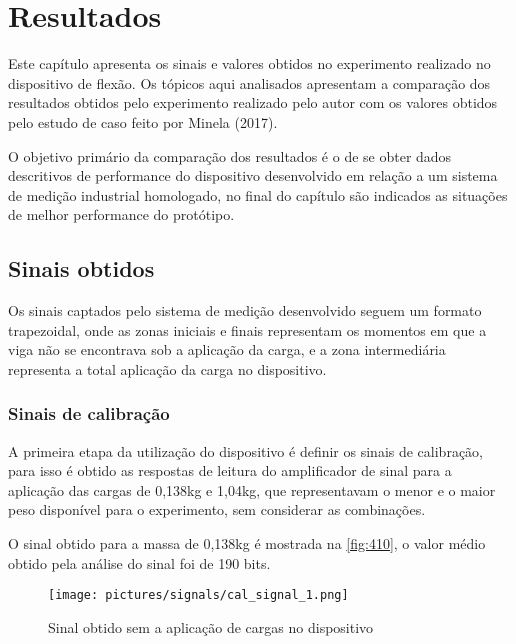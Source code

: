 
\chapter{Resultados}\label{ch:capitulo_resultados}

Este capítulo apresenta os sinais e valores obtidos no experimento realizado no dispositivo de flexão.
Os tópicos aqui analisados apresentam a comparação dos resultados obtidos pelo experimento realizado pelo autor com os valores obtidos pelo
estudo de caso feito por Minela (2017).

O objetivo primário da comparação dos resultados é o de se obter dados descritivos de performance do dispositivo desenvolvido em relação a um sistema de medição industrial
homologado, no final do capítulo são indicados as situações de melhor performance do protótipo.

\section{Sinais obtidos}

Os sinais captados pelo sistema de medição desenvolvido seguem um formato trapezoidal, onde as zonas iniciais e finais representam os momentos em que a viga não se encontrava
sob a aplicação da carga, e a zona intermediária representa a total aplicação da carga no dispositivo.

\subsection{Sinais de calibração}

A primeira etapa da utilização do dispositivo é definir os sinais de calibração, para isso é obtido as respostas de leitura do amplificador de sinal para a aplicação das cargas
de 0,138kg e 1,04kg, que representavam o menor e o maior peso disponível para o experimento, sem considerar as combinações.

O sinal obtido para a massa de 0,138kg é mostrada na \autoref{fig:410}, o valor médio obtido pela análise do sinal foi de 190 bits.

\begin{figure}[htb]
	\caption{\label{fig:410} Sinal obtido sem a aplicação de cargas no dispositivo}
	\begin{center}
		\texttt{[image: pictures/signals/cal\_signal\_1.png]}
	\end{center}
\end{figure}

